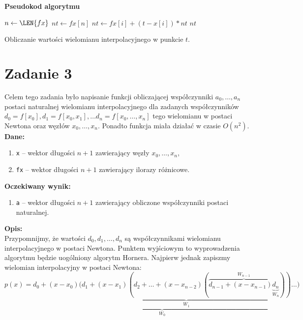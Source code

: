 \documentclass[]{article}
\begin{document}
	\clearpage
	\noindent\textbf{Pseudokod algorytmu}\\
	\begin{algorithm}[h]
		\DontPrintSemicolon
		
		 {
			$n \gets \LEN{fx}$\;
			$nt \gets fx[n]$\;
			 {
				$nt \gets fx[i] + (t - x[i]) * nt$\; 		
			}
			\KwRet $nt$\;
		}
		\caption{Obliczanie wartości wielomianu interpolacyjnego w punkcie $t$.}
	\end{algorithm}			
	
	

	\section*{Zadanie 3} 
	
	Celem tego zadania było napisanie funkcji obliczającej współczynniki $a_0,\ldots,a_n$ postaci naturalnej wielomianu interpolacyjnego dla zadanych współczynników $d_0 = f[x_0], d_1 = f[x_0,x_1], \ldots d_n = f[x_0, \ldots, x_n]$ tego wielomianu w postaci Newtona oraz węzłów $x_0, \ldots, x_n$. Ponadto funkcja miała działać w czasie $O(n^2)$.\\
	\textbf{Dane:}
	\begin{enumerate}[]
		\item \texttt{x} -- wektor długości $n+1$ zawierający węzły $x_0, \ldots, x_n$,
		\item \texttt{fx} -- wektor długości $n+1$ zawierający ilorazy różnicowe.
	\end{enumerate}
	\textbf{Oczekiwany wynik:}
	\begin{enumerate}[]
		\item \texttt{a} -- wektor długości $n+1$ zawierający obliczone współczynniki postaci naturalnej.
	\end{enumerate}
	\textbf{Opis:}\\
	Przypomnijmy, że wartości $d_0, d_1, \ldots, d_n$ są współczynnikami wielomianu interpolacyjnego w postaci Newtona. Punktem wyjściowym to wyprowadzenia algorytmu będzie uogólniony algorytm Hornera. Najpierw jednak zapiszmy wielomian interpolacyjny w postaci Newtona: 
	$$ p(x) = \underbrace{d_0 + (x-x_0)(\underbrace{d_1 + (x-x_1)
	(d_2 + \ldots + (x-x_{n-2})(\overbrace{d_{n-1}+(x-x_{n-1})\underbrace{d_n}_{W_n}}^{W_{n-1}}))}_{W_1}}_{W_0}\ldots)$$
\end{document}

